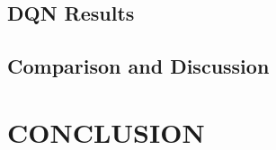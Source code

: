 \documentclass[final,11pt,times]{elsarticle}
\begin{document}


\subsection{DQN Results}



\subsection{Comparison and Discussion}



\section{CONCLUSION}
\label{sec:conclusion}

\end{document}
